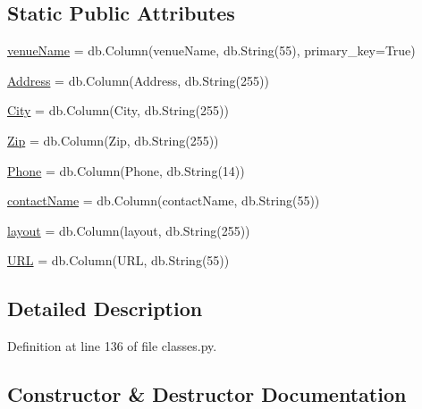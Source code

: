 \subsection*{Static Public Attributes}
\begin{DoxyCompactItemize}
\item 
\hyperlink{class_web_content_1_1classes_1_1venues_a9b9a18b684f7b9e71a8068443cd008d2}{venue\+Name} = db.\+Column(\textquotesingle{}venue\+Name\textquotesingle{}, db.\+String(55), primary\+\_\+key=True)
\item 
\hyperlink{class_web_content_1_1classes_1_1venues_a5e482b9cf50927587cd0940be0a65eb4}{Address} = db.\+Column(\textquotesingle{}Address\textquotesingle{}, db.\+String(255))
\item 
\hyperlink{class_web_content_1_1classes_1_1venues_a1575dda3b6e4b1ba7b89b03e31cfb0c9}{City} = db.\+Column(\textquotesingle{}City\textquotesingle{}, db.\+String(255))
\item 
\hyperlink{class_web_content_1_1classes_1_1venues_ac3846ed9b5b20948852b9374dd35fd22}{Zip} = db.\+Column(\textquotesingle{}Zip\textquotesingle{}, db.\+String(255))
\item 
\hyperlink{class_web_content_1_1classes_1_1venues_a5bf3b821cbc920a6f970c36577a451a4}{Phone} = db.\+Column(\textquotesingle{}Phone\textquotesingle{}, db.\+String(14))
\item 
\hyperlink{class_web_content_1_1classes_1_1venues_a2bcc906a39635f4e154cff0a5d1070ad}{contact\+Name} = db.\+Column(\textquotesingle{}contact\+Name\textquotesingle{}, db.\+String(55))
\item 
\hyperlink{class_web_content_1_1classes_1_1venues_a68472a0e51533d6ee114f3668e262bd6}{layout} = db.\+Column(\textquotesingle{}layout\textquotesingle{}, db.\+String(255))
\item 
\hyperlink{class_web_content_1_1classes_1_1venues_a4c87fdcce94a8d92e888b0ef112da682}{U\+RL} = db.\+Column(\textquotesingle{}U\+RL\textquotesingle{}, db.\+String(55))
\end{DoxyCompactItemize}


\subsection{Detailed Description}


Definition at line 136 of file classes.\+py.



\subsection{Constructor \& Destructor Documentation}
\mbox{\label{class_web_content_1_1classes_1_1venues_ad7ff0f4c4610450e6d2afb55ebab01cb}} 
